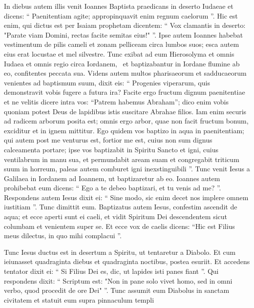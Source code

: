 \begin{biblechapter}
\begin{biblechapter}
\begin{biblechapter}
\verse In diebus autem illis venit Ioannes Baptista praedicans in deserto Iudaeae 
\verse et dicens: “ Paenitentiam agite; appropinquavit enim regnum caelorum ”.
 \verse Hic est enim, qui dictus est per Isaiam prophetam dicentem:
 “ Vox clamantis in deserto:
 "Parate viam Domini,
 rectas facite semitas eius!" ”.
 \verse Ipse autem Ioannes habebat vestimentum de pilis cameli et zonam pelliceam circa lumbos suos; esca autem eius erat locustae et mel silvestre.
 \verse Tunc exibat ad eum Hierosolyma et omnis Iudaea et omnis regio circa Iordanem, 
 \verse et baptizabantur in Iordane flumine ab eo, confitentes peccata sua.
 \verse Videns autem multos pharisaeorum et sadducaeorum venientes ad baptismum suum, dixit eis: “ Progenies viperarum, quis demonstravit vobis fugere a futura ira? 
\verse Facite ergo fructum dignum paenitentiae 
\verse et ne velitis dicere intra vos: “Patrem habemus Abraham”; dico enim vobis quoniam potest Deus de lapidibus istis suscitare Abrahae filios. 
\verse Iam enim securis ad radicem arborum posita est; omnis ergo arbor, quae non facit fructum bonum, exciditur et in ignem mittitur. 
\verse Ego quidem vos baptizo in aqua in paenitentiam; qui autem post me venturus est, fortior me est, cuius non sum dignus calceamenta portare; ipse vos baptizabit in Spiritu Sancto et igni, 
\verse cuius ventilabrum in manu sua, et permundabit aream suam et congregabit triticum suum in horreum, paleas autem comburet igni inexstinguibili ”.
 \verse Tunc venit Iesus a Galilaea in Iordanem ad Ioannem, ut baptizaretur ab eo. 
 \verse Ioannes autem prohibebat eum dicens: “ Ego a te debeo baptizari, et tu venis ad me? ”. 
\verse Respondens autem Iesus dixit ei: “ Sine modo, sic enim decet nos implere omnem iustitiam ”. Tunc dimittit eum. 
\verse Baptizatus autem Iesus, confestim ascendit de aqua; et ecce aperti sunt ei caeli, et vidit Spiritum Dei descendentem sicut columbam et venientem super se. 
\verse Et ecce vox de caelis dicens: “Hic est Filius meus dilectus, in quo
 mihi complacui ”. 
\begin{biblechapter}
\verse Tunc Iesus ductus est in desertum a Spiritu, ut tentaretur a Diabolo. 
 \verse Et cum ieiunasset quadraginta diebus et quadraginta noctibus, postea esuriit. 
 \verse Et accedens tentator dixit ei: “ Si Filius Dei es, dic, ut lapides isti panes fiant ”. 
\verse Qui respondens dixit:
 “ Scriptum est:
 "Non in pane solo vivet homo,
 sed in omni verbo, quod procedit de ore Dei" ”.
 \verse Tunc assumit eum Diabolus in sanctam civitatem et statuit eum supra pinnaculum templi 

\end{biblechapter}
\end{biblechapter}
\end{biblechapter}
\end{biblechapter}
